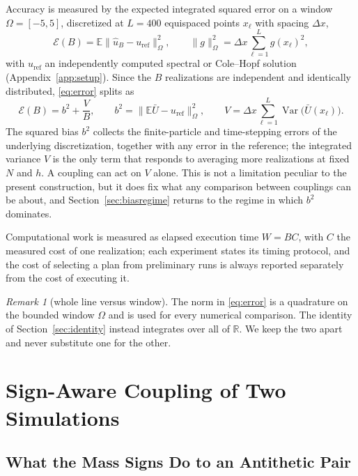 \documentclass[smallextended,nospthms]{svjour3}
\theoremstyle{plain}
\theoremstyle{definition}
\theoremstyle{remark}
\newtheorem{remark}[proposition]{Remark}
\numberwithin{equation}{section}
\newcommand{\E}{\mathbb{E}}
\newcommand{\Var}{\operatorname{Var}}
\newcommand{\R}{\mathbb{R}}
\begin{document}
Accuracy is measured by the expected integrated squared error on a window
$\Omega=[-5,5]$, discretized at $L=400$ equispaced points $x_\ell$ with spacing
$\Delta x$,
\begin{equation}
 \mathcal E(B)=\E\bigl\|\hat u_B-u_{\mathrm{ref}}\bigr\|_\Omega^2,
 \qquad
 \|g\|_\Omega^2=\Delta x\sum_{\ell=1}^{L}g(x_\ell)^2 ,
 \label{eq:error}
\end{equation}
with $u_{\mathrm{ref}}$ an independently computed spectral or Cole--Hopf
solution (Appendix~\ref{app:setup}). Since the $B$ realizations are independent
and identically distributed, \eqref{eq:error} splits as
\begin{equation}
 \mathcal E(B)=b^2+\frac{V}{B},
 \qquad
 b^2=\bigl\|\E\bar U-u_{\mathrm{ref}}\bigr\|_\Omega^2,
 \qquad
 V=\Delta x\sum_{\ell=1}^{L}\Var\bigl(\bar U(x_\ell)\bigr).
 \label{eq:decomposition}
\end{equation}
The squared bias $b^2$ collects the finite-particle and time-stepping errors of
the underlying discretization, together with any error in the reference; the
integrated variance $V$ is the only term that responds to averaging more
realizations at fixed $N$ and $h$. A coupling can act on $V$ alone. This is not
a limitation peculiar to the present construction, but it does fix what any
comparison between couplings can be about, and Section~\ref{sec:biasregime}
returns to the regime in which $b^2$ dominates.

Computational work is measured as elapsed execution time $W=BC$, with $C$ the
measured cost of one realization; each experiment states its timing protocol,
and the cost of selecting a plan from preliminary runs is always reported
separately from the cost of executing it.

\begin{remark}[whole line versus window]
\label{rem:window}
The norm in \eqref{eq:error} is a quadrature on the bounded window $\Omega$ and
is used for every numerical comparison. The identity of
Section~\ref{sec:identity} instead integrates over all of $\R$. We keep the two
apart and never substitute one for the other.
\end{remark}

\section{Sign-Aware Coupling of Two Simulations}
\label{sec:coupling}

\subsection{What the Mass Signs Do to an Antithetic Pair}
\label{sec:motivation}
\end{document}
